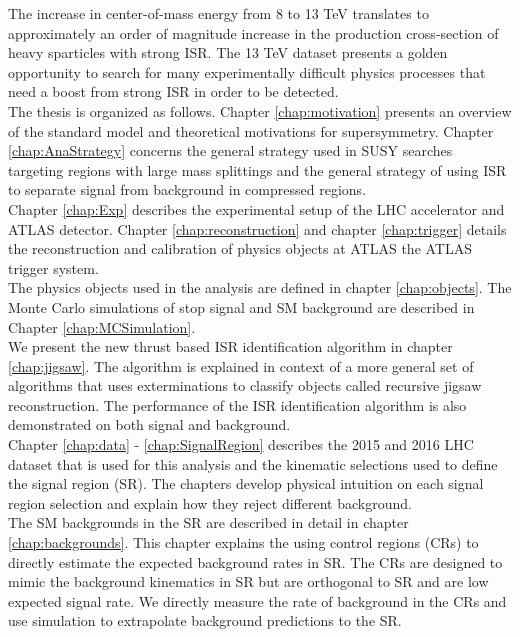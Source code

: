 \indent  The increase in center-of-mass energy from 8 to 13 TeV translates to approximately an order of magnitude increase in the production cross-section of heavy sparticles with strong ISR.  The 13 TeV dataset presents a golden opportunity to search for many experimentally difficult physics processes that need a boost from strong ISR in order to be detected. \\

\indent The thesis is organized as follows.  Chapter \ref{chap:motivation} presents an overview of the standard model and theoretical motivations for supersymmetry. Chapter \ref{chap:AnaStrategy} concerns the general strategy used in SUSY searches targeting regions with large mass splittings and the general strategy of using ISR to separate signal from background in compressed regions.  \\

\indent Chapter \ref{chap:Exp} describes the experimental setup of the LHC accelerator and ATLAS detector.   Chapter \ref{chap:reconstruction} and chapter \ref{chap:trigger} details the reconstruction and calibration of physics objects at ATLAS the ATLAS trigger system.  \\

\indent The physics objects used in the analysis are defined in chapter \ref{chap:objects}.  The Monte Carlo simulations of stop signal and SM background are described in Chapter \ref{chap:MCSimulation}.  \\ 

\indent We present the new thrust based ISR identification algorithm in chapter \ref{chap:jigsaw}.  The algorithm is explained in context of a more general set of algorithms that uses exterminations to classify objects called recursive jigsaw reconstruction.  The performance of the ISR identification algorithm is also demonstrated on both signal and background. \\

\indent Chapter \ref{chap:data} - \ref{chap:SignalRegion} describes the 2015 and 2016 LHC dataset that is used for this analysis and the kinematic selections used to define the signal region (SR).  The chapters develop physical intuition on each signal region selection and explain how they reject different background.  \\

\indent The SM backgrounds in the SR are described in detail in chapter \ref{chap:backgrounds}.  This chapter explains the using control regions (CRs) to directly estimate the expected background rates in SR.  The CRs are designed to mimic the background kinematics in SR but are orthogonal to SR and are low expected signal rate.  We directly measure the rate of background in the CRs and use simulation to extrapolate background predictions to the SR. \\

